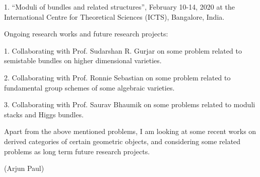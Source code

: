 \documentclass[11pt,a4paper,leqno]{article}
\numberwithin{equation}{subsection}
\theoremstyle{definition}
\begin{document}
	1. “Moduli of bundles and related structures”, February 10-14, 2020 at the International Centre for Theoretical Sciences (ICTS), Bangalore, India.
	
	
	Ongoing research works and future research projects:
	
	1. Collaborating with Prof. Sudarshan R. Gurjar on some problem related to semistable bundles on higher dimensional varieties. 
	
	2. Collaborating with Prof. Ronnie Sebastian on some problem related to fundamental group schemes of some algebraic varieties. 
	
	3. Collaborating with Prof. Saurav Bhaumik on some problems related to moduli stacks and Higgs bundles. 
	
	Apart from the above mentioned problems, I am looking at some recent works on derived categories of certain geometric objects, and considering some related problems as long term future research projects. 
	
	
	(Arjun Paul) 
\end{document}
